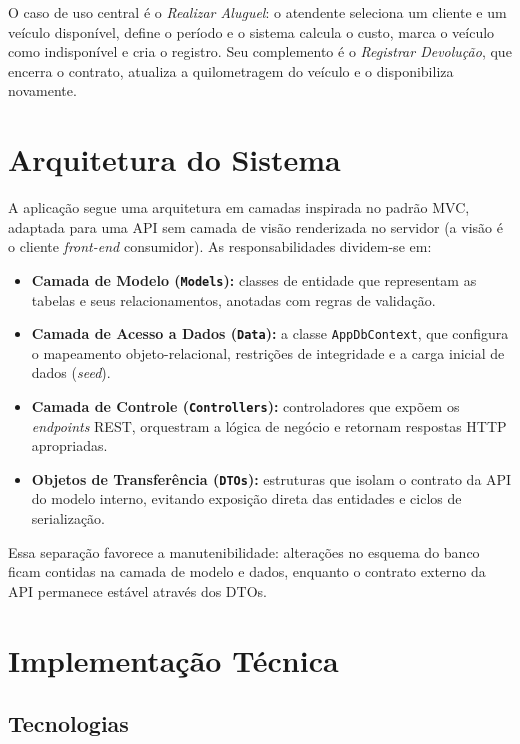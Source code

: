 \documentclass[12pt]{article}
\begin{document}
O caso de uso central é o \emph{Realizar Aluguel}: o atendente seleciona um cliente e um veículo disponível, define o período e o sistema calcula o custo, marca o veículo como indisponível e cria o registro. Seu complemento é o \emph{Registrar Devolução}, que encerra o contrato, atualiza a quilometragem do veículo e o disponibiliza novamente.

\section{Arquitetura do Sistema}

A aplicação segue uma arquitetura em camadas inspirada no padrão MVC, adaptada para uma API sem camada de visão renderizada no servidor (a visão é o cliente \emph{front-end} consumidor). As responsabilidades dividem-se em:

\begin{itemize}
  \item \textbf{Camada de Modelo (\texttt{Models}):} classes de entidade que representam as tabelas e seus relacionamentos, anotadas com regras de validação.
  \item \textbf{Camada de Acesso a Dados (\texttt{Data}):} a classe \texttt{AppDbContext}, que configura o mapeamento objeto-relacional, restrições de integridade e a carga inicial de dados (\emph{seed}).
  \item \textbf{Camada de Controle (\texttt{Controllers}):} controladores que expõem os \emph{endpoints} REST, orquestram a lógica de negócio e retornam respostas HTTP apropriadas.
  \item \textbf{Objetos de Transferência (\texttt{DTOs}):} estruturas que isolam o contrato da API do modelo interno, evitando exposição direta das entidades e ciclos de serialização.
\end{itemize}

Essa separação favorece a manutenibilidade: alterações no esquema do banco ficam contidas na camada de modelo e dados, enquanto o contrato externo da API permanece estável através dos DTOs.

\section{Implementação Técnica}

\subsection{Tecnologias}
\end{document}

